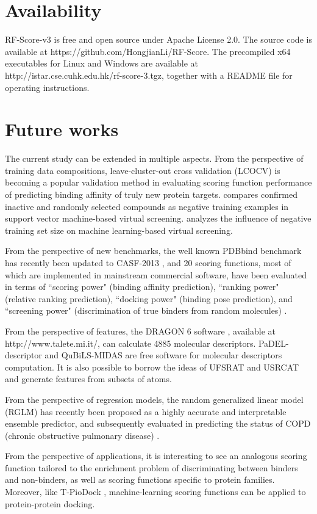 \section{Availability}

RF-Score-v3 is free and open source under Apache License 2.0. The source code is available at https://github.com/HongjianLi/RF-Score. The precompiled x64 executables for Linux and Windows are available at http://istar.cse.cuhk.edu.hk/rf-score-3.tgz, together with a README file for operating instructions.

\section{Future works}

The current study can be extended in multiple aspects. From the perspective of training data compositions, leave-cluster-out cross validation (LCOCV) \citep{774} is becoming a popular validation method in evaluating scoring function performance of predicting binding affinity of truly new protein targets. \citep{1423} compares confirmed inactive and randomly selected compounds as negative training examples in support vector machine-based virtual screening. \citep{1404} analyzes the influence of negative training set size on machine learning-based virtual screening.

From the perspective of new benchmarks, the well known PDBbind benchmark has recently been updated to CASF-2013 \citep{1426}, and 20 scoring functions, most of which are implemented in mainstream commercial software, have been evaluated in terms of ``scoring power" (binding affinity prediction), ``ranking power" (relative ranking prediction), ``docking power" (binding pose prediction), and ``screening power" (discrimination of true binders from random molecules) \citep{1411}.

From the perspective of features, the DRAGON 6 software \citep{1478}, available at http://www.talete.mi.it/, can calculate 4885 molecular descriptors. PaDEL-descriptor \citep{1479} and QuBiLS-MIDAS \citep{1400} are free software for molecular
descriptors computation. It is also possible to borrow the ideas of UFSRAT \citep{1436} and USRCAT \citep{1331} and generate features from subsets of atoms.

From the perspective of regression models, the random generalized linear model (RGLM) has recently been proposed \citep{1377} as a highly accurate and interpretable ensemble predictor, and subsequently evaluated in predicting the status of COPD (chronic
obstructive pulmonary disease) \citep{1418}.

From the perspective of applications, it is interesting to see an analogous scoring function tailored to the enrichment problem of discriminating between binders and non-binders, as well as scoring functions specific to protein families. Moreover, like T-PioDock \citep{1399}, machine-learning scoring functions can be applied to protein-protein docking.

\chapterend

